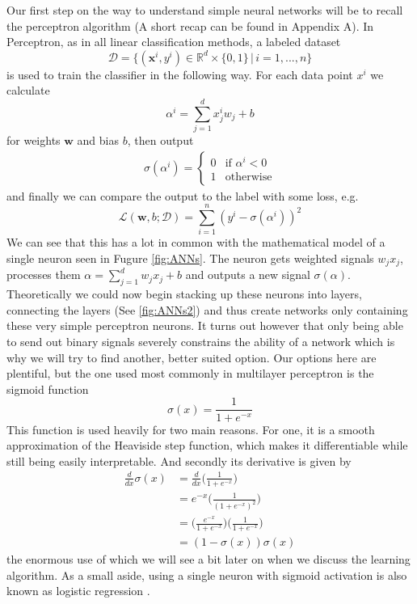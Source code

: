 \documentclass[preprint,12pt,3p]{elsarticle}
\begin{document}
Our first step on the way to understand simple neural networks will be to recall the perceptron algorithm (A short recap can be found in Appendix A). In Perceptron, as in all linear classification methods, a labeled dataset 
$${\mathcal{D}=\{(\mathbf{x}^i,y^i)\in\mathbb{R}^d\times\{0,1\}\,|\,i=1,...,n\}}$$ 
is used to train the classifier in the following way. For each data point $x^i$ we calculate 
$$\alpha^i=\sum_{j=1}^dx^i_jw_j+b$$
for weights $\mathbf{w}$ and bias $b$, then output 
\begin{align*}
    \sigma(\alpha^i)=\begin{cases}0 &\mbox{if }\alpha^i<0\\
    1 & \mbox{otherwise}\end{cases}
\end{align*} 
and finally we can compare the output to the label with some loss, e.g.
$$\mathcal{L}(\mathbf{w},b;\mathcal{D})=\sum_{i=1}^n(y^i-\sigma(\alpha^i))^2$$
We can see that this has a lot in common with the mathematical model of a single neuron seen in Fugure \ref{fig:ANNs}. The neuron gets weighted signals $w_jx_j$, processes them ${\alpha=\sum_{j=1}^dw_jx_j+b}$ and outputs a new signal $\sigma(\alpha)$. Theoretically we could now begin stacking up these neurons into layers, connecting the layers (See \ref{fig:ANNs2}) and thus create networks only containing these very simple perceptron neurons. It turns out however that only being able to send out binary signals severely constrains the ability of a network which is why we will try to find another, better suited option. Our options here are plentiful, but the one used most commonly in multilayer perceptron is the sigmoid function
$$\sigma(x)=\frac{1}{1+e^{-x}}$$
This function is used heavily for two main reasons. For one, it is a smooth approximation of the Heaviside step function, which makes it differentiable while still being easily interpretable. And secondly its derivative is given by
\begin{align*}
    \frac{d}{dx}\sigma(x)&=\frac{d}{dx}\Big(\frac{1}{1+e^{-x}}\Big)\\
    &=e^{-x}\Big(\frac{1}{(1+e^{-x})^2}\Big)\\
    &=\Big(\frac{e^{-x}}{1+e^{-x}}\Big)\Big(\frac{1}{1+e^{-x}}\Big)\\
    &=(1-\sigma(x))\sigma(x)
\end{align*}
the enormous use of which we will see a bit later on when we discuss the learning algorithm. 
As a small aside, using a single neuron with sigmoid activation is also known as logistic regression .
\end{document}
